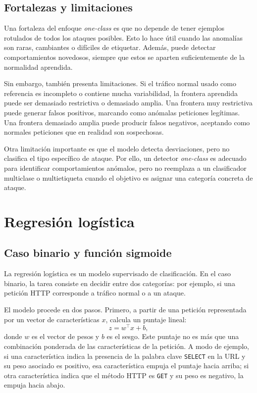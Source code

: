 \documentclass[12pt,oneside]{report}
\begin{document}
\subsection{Fortalezas y limitaciones}

Una fortaleza del enfoque \textit{one-class} es que no depende de tener ejemplos rotulados de todos los ataques posibles. Esto lo hace útil cuando las anomalías son raras, cambiantes o difíciles de etiquetar. Además, puede detectar comportamientos novedosos, siempre que estos se aparten suficientemente de la normalidad aprendida.

Sin embargo, también presenta limitaciones. Si el tráfico normal usado como referencia es incompleto o contiene mucha variabilidad, la frontera aprendida puede ser demasiado restrictiva o demasiado amplia. Una frontera muy restrictiva puede generar falsos positivos, marcando como anómalas peticiones legítimas. Una frontera demasiado amplia puede producir falsos negativos, aceptando como normales peticiones que en realidad son sospechosas.

Otra limitación importante es que el modelo detecta desviaciones, pero no clasifica el tipo específico de ataque. Por ello, un detector \textit{one-class} es adecuado para identificar comportamientos anómalos, pero no reemplaza a un clasificador multiclase o multietiqueta cuando el objetivo es asignar una categoría concreta de ataque.

\section{Regresión logística}

\subsection{Caso binario y función sigmoide}

La regresión logística es un modelo supervisado de clasificación. En el caso
binario, la tarea consiste en decidir entre dos categorías: por ejemplo,
si una petición HTTP corresponde a tráfico normal o a un ataque.

El modelo procede en dos pasos. Primero, a partir de una petición
representada por un vector de características $x$, calcula un puntaje lineal:
\[
z=w^\top x+b,
\]
donde $w$ es el vector de pesos y $b$ es el sesgo. Este puntaje no es más
que una combinación ponderada de las características de la petición. A modo
de ejemplo, si una característica indica la presencia de la palabra clave
\texttt{SELECT} en la URL y su peso asociado es positivo, esa característica
empuja el puntaje hacia arriba; si otra característica indica que el método
HTTP es \texttt{GET} y su peso es negativo, la empuja hacia abajo.
\end{document}

